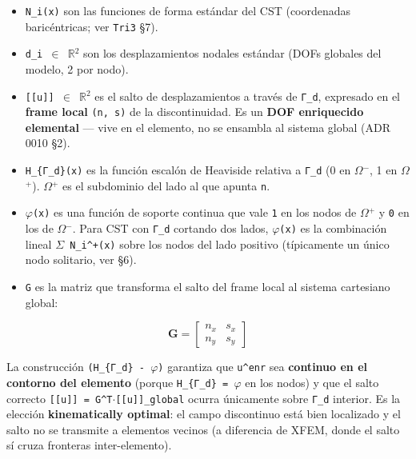 \documentclass[11pt,letterpaper,oneside]{report}
\begin{document}
\begin{itemize}
  \item \texttt{N\_i(x)} son las funciones de forma estándar del CST (coordenadas baricéntricas; ver \texttt{Tri3} §7).
  \item \texttt{d\_i \ensuremath{\in} \ensuremath{\mathbb{R}}\ensuremath{^{2}}} son los desplazamientos nodales estándar (DOFs globales del modelo, 2 por nodo).
  \item \texttt{[[u]] \ensuremath{\in} \ensuremath{\mathbb{R}}\ensuremath{^{2}}} es el salto de desplazamientos a través de \texttt{Γ\_d}, expresado en el \textbf{frame local} \texttt{(n, s)} de la discontinuidad. Es un \textbf{DOF enriquecido elemental} --- vive en el elemento, no se ensambla al sistema global (ADR 0010 §2).
  \item \texttt{H\_\{Γ\_d\}(x)} es la función escalón de Heaviside relativa a \texttt{Γ\_d} (0 en \texttt{\ensuremath{\Omega}\ensuremath{^{-}}}, 1 en \texttt{\ensuremath{\Omega}\ensuremath{^{+}}}). \texttt{\ensuremath{\Omega}\ensuremath{^{+}}} es el subdominio del lado al que apunta \texttt{n}.
  \item \texttt{\ensuremath{\varphi}(x)} es una función de soporte continua que vale \texttt{1} en los nodos de \texttt{\ensuremath{\Omega}\ensuremath{^{+}}} y \texttt{0} en los de \texttt{\ensuremath{\Omega}\ensuremath{^{-}}}. Para CST con \texttt{Γ\_d} cortando dos lados, \texttt{\ensuremath{\varphi}(x)} es la combinación lineal \texttt{\ensuremath{\Sigma} N\_i\textasciicircum{}+(x)} sobre los nodos del lado positivo (típicamente un único nodo solitario, ver §6).
  \item \texttt{G} es la matriz que transforma el salto del frame local al sistema cartesiano global:
\end{itemize}

\[
\mathbf G = \begin{bmatrix} n_x & s_x \\ n_y & s_y \end{bmatrix}
\]

La construcción \texttt{(H\_\{Γ\_d\} - \ensuremath{\varphi})} garantiza que \texttt{u\textasciicircum{}enr} sea \textbf{continuo en el contorno del elemento} (porque \texttt{H\_\{Γ\_d\} = \ensuremath{\varphi}} en los nodos) y que el salto correcto \texttt{[[u]] = G\textasciicircum{}T\ensuremath{\cdot}[[u]]\_global} ocurra únicamente sobre \texttt{Γ\_d} interior. Es la elección \textbf{kinematically optimal}: el campo discontinuo está bien localizado y el salto no se transmite a elementos vecinos (a diferencia de XFEM, donde el salto sí cruza fronteras inter-elemento).
\end{document}
